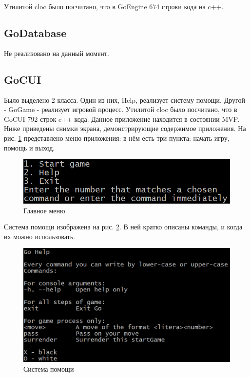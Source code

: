 Утилитой cloc было посчитано, что в GoEngine 674 строки кода на c++.

\subsection*{GoDatabase}

Не реализовано на данный момент.\\

\subsection*{GoCUI}

Было выделено 2 класса. Один из них, Help, реализует систему помощи. Другой - GoGame - реализует игровой процесс. Утилитой cloc было посчитано, что в GoCUI 792 строк c++ кода. Данное приложение находится в состоянии MVP.\\

Ниже приведены снимки экрана, демонстрирующие содержимое приложения. На рис. \ref{pic:CUI_Menu} представлено меню приложения: в нём есть три пункта: начать игру, помощь и выход.

\begin{figure}[H]
	\begin{center}
		\includegraphics[scale=0.6]{pics/GoCUI/Menu.png}
	    \caption{Главное меню} 
		\label{pic:CUI_Menu}
	\end{center}
\end{figure}

Система помощи изображена на рис. \ref{pic:CUI_Help}. В ней кратко описаны команды, и когда их можно использовать.

\begin{figure}[H]
	\begin{center}
		\includegraphics[scale=0.6]{pics/GoCUI/Help.png}
	    \caption{Система помощи} 
		\label{pic:CUI_Help}
	\end{center}
\end{figure}

